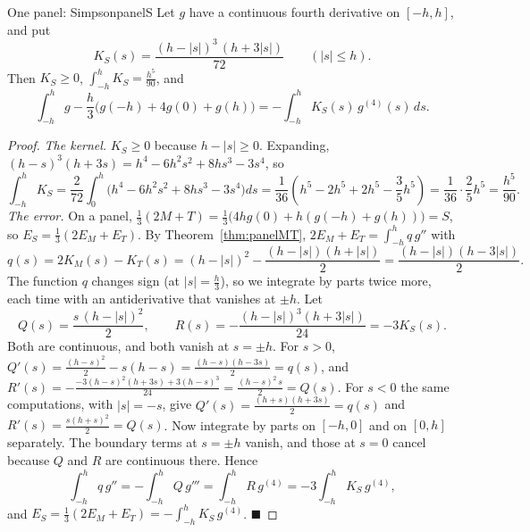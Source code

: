 \documentclass[11pt]{article}
\begin{document}
\begin{thm}{One panel: Simpson}{panelS}
Let $g$ have a continuous fourth derivative on $[-h,h]$, and put
\[K_S(s)=\frac{(h-\lvert s\rvert)^3\,(h+3\lvert s\rvert)}{72}\qquad(\lvert s\rvert\le h).\]
Then $K_S\ge0$, $\displaystyle\int_{-h}^hK_S=\frac{h^5}{90}$, and
\[\int_{-h}^hg-\frac h3\big(g(-h)+4g(0)+g(h)\big)=-\int_{-h}^hK_S(s)\,g^{(4)}(s)\,ds.\]
\end{thm}
\begin{proof}
\emph{The kernel.} $K_S\ge0$ because $h-\lvert s\rvert\ge0$. Expanding, $(h-s)^3(h+3s)=h^4-6h^2s^2+8hs^3-3s^4$, so
\[\int_{-h}^hK_S=\frac2{72}\int_0^h\big(h^4-6h^2s^2+8hs^3-3s^4\big)ds=\frac1{36}\left(h^5-2h^5+2h^5-\frac35h^5\right)=\frac1{36}\cdot\frac25h^5=\frac{h^5}{90}.\]
\emph{The error.} On a panel, $\frac13(2M+T)=\frac13\big(4hg(0)+h(g(-h)+g(h))\big)=S$, so $E_S=\frac13(2E_M+E_T)$. By Theorem~\ref{thm:panelMT}, $2E_M+E_T=\int_{-h}^hq\,g''$ with
\[q(s)=2K_M(s)-K_T(s)=(h-\lvert s\rvert)^2-\frac{(h-\lvert s\rvert)(h+\lvert s\rvert)}2=\frac{(h-\lvert s\rvert)(h-3\lvert s\rvert)}2.\]
The function $q$ changes sign (at $\lvert s\rvert=\frac h3$), so we integrate by parts twice more, each time with an antiderivative that vanishes at $\pm h$. Let
\[Q(s)=\frac{s\,(h-\lvert s\rvert)^2}2,\qquad R(s)=-\frac{(h-\lvert s\rvert)^3(h+3\lvert s\rvert)}{24}=-3K_S(s).\]
Both are continuous, and both vanish at $s=\pm h$. For $s>0$, $Q'(s)=\frac{(h-s)^2}2-s(h-s)=\frac{(h-s)(h-3s)}2=q(s)$, and $R'(s)=-\frac{-3(h-s)^2(h+3s)+3(h-s)^3}{24}=\frac{(h-s)^2\,s}2=Q(s)$. For $s<0$ the same computations, with $\lvert s\rvert=-s$, give $Q'(s)=\frac{(h+s)(h+3s)}2=q(s)$ and $R'(s)=\frac{s(h+s)^2}2=Q(s)$.
Now integrate by parts on $[-h,0]$ and on $[0,h]$ separately. The boundary terms at $s=\pm h$ vanish, and those at $s=0$ cancel because $Q$ and $R$ are continuous there. Hence
\[\int_{-h}^hq\,g''=-\int_{-h}^hQ\,g'''=\int_{-h}^hR\,g^{(4)}=-3\int_{-h}^hK_S\,g^{(4)},\]
and $E_S=\frac13(2E_M+E_T)=-\int_{-h}^hK_S\,g^{(4)}$. $\blacksquare$
\end{proof}
\end{document}
